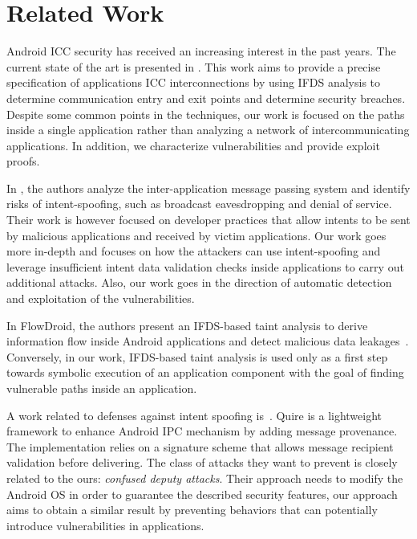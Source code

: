 \section{Related Work}
\label{sec:related}

Android ICC security has received an increasing interest in the past years. 
The current state of the art is presented in \cite{Epicc}. This work aims to provide a precise specification of applications ICC interconnections by using IFDS analysis to determine communication entry and exit points and determine security breaches. Despite some common points in the techniques, our work is focused on the paths inside a single application rather than analyzing a network of intercommunicating applications. In addition, we characterize vulnerabilities and provide exploit proofs. 

In \cite{chin2011analyzing}, the authors analyze the inter-application message passing system and identify risks of intent-spoofing, such as broadcast eavesdropping and denial of service. Their work is however focused on developer practices that allow intents to be sent by malicious applications and received by victim applications. Our work goes more in-depth and focuses on how the attackers can use intent-spoofing and leverage insufficient intent data validation checks inside applications to carry out additional attacks. Also, our work goes in the direction of automatic detection and exploitation of the vulnerabilities.

In FlowDroid, the authors present an IFDS-based taint analysis to derive information flow inside Android applications and detect malicious data leakages~\cite{flowdroid}. Conversely, in our work, IFDS-based taint analysis is used only as a first step towards symbolic execution of an application component with the goal of finding vulnerable paths inside an application.

A work related to defenses against intent spoofing is~\cite{quire2011}. Quire is a lightweight framework to enhance Android IPC mechanism by adding message provenance. The implementation relies on a signature scheme that allows message recipient validation before delivering. The class of attacks they want to prevent is closely related to the ours: \emph{confused deputy attacks}. Their approach needs to modify the Android OS in order to guarantee the described security features, our approach aims to obtain a similar result by preventing behaviors that can potentially introduce vulnerabilities in applications.

